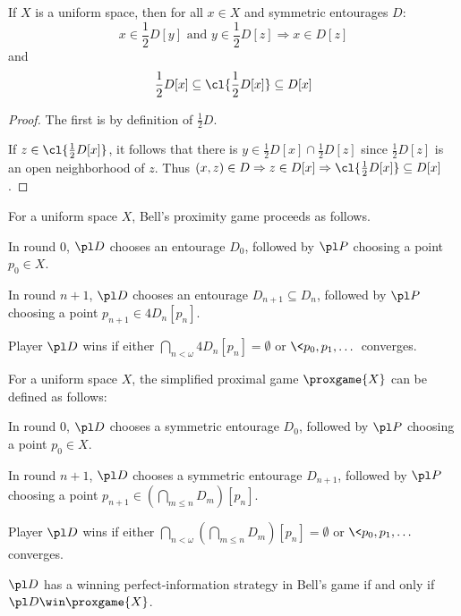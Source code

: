 \begin{prop}
  If $X$ is a uniform space, then for all $x\in X$ and symmetric entourages $D$:
    \[
      x\in \frac{1}{2}D[y]\text{ and } y\in\frac{1}{2}D[z] \Rightarrow x\in D[z]
    \]
  and
    \[
      \frac{1}{2}D[x]\subseteq \cl{\frac{1}{2}D[x]}\subseteq D[x]
    \]
\end{prop}

\begin{proof}
  The first is by definition of $\frac{1}{2}D$.

  If $z\in \cl{\frac{1}{2}D[x]}$, it follows that there is $y\in \frac{1}{2}D[x]\cap\frac{1}{2}D[z]$ since $\frac{1}{2}D[z]$ is an open neighborhood of $z$. Thus $(x,z)\in D \Rightarrow z\in D[x] \Rightarrow \cl{\frac{1}{2}D[x]}\subseteq D[x]$.
\end{proof}

\begin{defn}
  For a uniform space $X$, Bell's proximity game proceeds as follows. 

  In round $0$, $\pl D$ chooses an entourage $D_0$, followed by $\pl P$ choosing a point $p_0\in X$. 

  In round $n+1$, $\pl D$ chooses an entourage $D_{n+1}\subseteq D_n$, followed by $\pl P$ choosing a point $p_{n+1}\in 4D_n[p_n]$.

  Player $\pl D$ wins if either $\bigcap_{n<\omega} 4D_n[p_n] = \emptyset$ or $\<p_0,p_1,\dots\>$ converges.
\end{defn}

\begin{defn}
  For a uniform space $X$, the simplified proximal game $\proxgame{X}$ can be defined as follows:

  In round $0$, $\pl D$ chooses a symmetric entourage $D_0$, followed by $\pl P$ choosing a point $p_0\in X$. 

  In round $n+1$, $\pl D$ chooses a symmetric entourage $D_{n+1}$, followed by $\pl P$ choosing a point $p_{n+1}\in\left(\bigcap_{m\leq n}D_m\right)[p_n]$.

  Player $\pl D$ wins if either $\bigcap_{n<\omega}\left(\bigcap_{m\leq n} D_m\right)[p_n]=\emptyset$ or $\<p_0,p_1,\dots\>$ converges.
\end{defn}

\begin{thm}
  $\pl D$ has a winning perfect-information strategy in Bell's game if and only if $\pl D\win\proxgame{X}$.
\end{thm}

